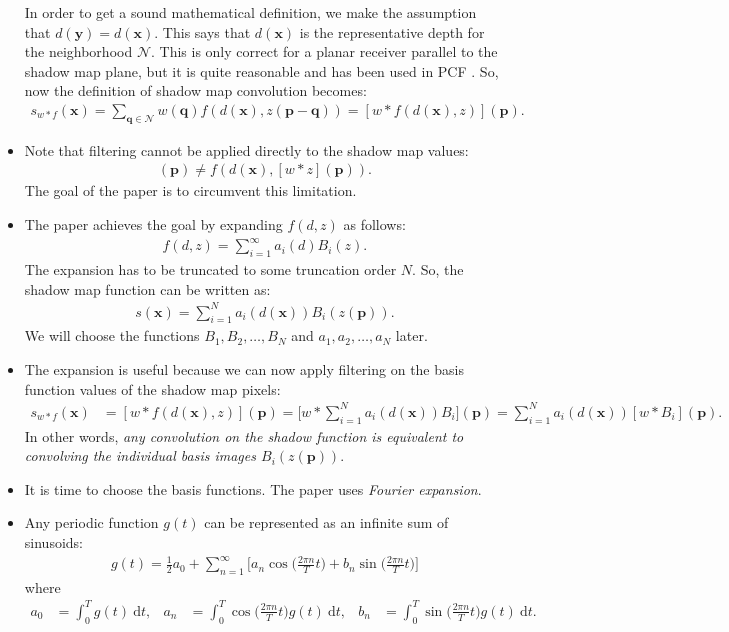 \documentclass[10pt]{article}
\newcommand{\dee}{\mathrm{d}}
\newcommand{\ve}[1]{\mathbf{#1}}
\begin{document}
\begin{itemize}
  	In order to get a sound mathematical definition, we make the assumption that $d(\ve{y}) = d(\ve{x})$.  This says that $d(\ve{x})$ is the representative depth for the neighborhood $\mathcal{N}$.  This is only correct for a planar receiver parallel to the shadow map plane, but it is quite reasonable and has been used in PCF \cite{Reeves:1987}.  So, now the definition of shadow map convolution becomes:
  	\begin{align*}
  		s_{w*f}(\ve{x}) 
  		= \sum_{\ve{q} \in \mathcal{N}} w(\ve{q}) f(d(\ve{x}), z(\ve{p} - \ve{q}))
  		= [w * f(d(\ve{x}),z)](\ve{p}).
  	\end{align*}

  	\item Note that filtering cannot be applied directly to the shadow map values:
  	\begin{align*}
  		[w * f(d(\ve{x}),z)](\ve{p}) \neq f(d(\ve{x}),[w*z](\ve{p})).
  	\end{align*}
  	The goal of the paper is to circumvent this limitation.

  	\item The paper achieves the goal by expanding $f(d,z)$ as follows:
  	\begin{align*}
  		f(d,z) = \sum_{i=1}^\infty a_i(d) B_i(z).
  	\end{align*}
  	The expansion has to be truncated to some truncation order $N$.  So, the shadow map function can be written as:
  	\begin{align*}
  		s(\ve{x}) = \sum_{i=1}^N a_i(d(\ve{x}))B_i(z(\ve{p})).
  	\end{align*}
  	We will choose the functions $B_1, B_2, \dotsc, B_N$ and $a_1, a_2, \dotsc, a_N$ later.

  	\item The expansion is useful because we can now apply filtering on the basis function values of the shadow map pixels:
  	\begin{align*}
  		s_{w * f}(\ve{x}) 
  		&= [w*f(d(\ve{x}),z)](\ve{p}) 
  		= \bigg[ w * \sum_{i=1}^N a_i(d(\ve{x})) B_i \bigg](\ve{p}) 
  		= \sum_{i=1}^N a_i(d(\ve{x})) [w*B_i](\ve{p}).  		
  	\end{align*}
  	In other words, \emph{any convolution on the shadow function is equivalent to convolving the individual basis images $B_i(z(\ve{p}))$}.

  	\item It is time to choose the basis functions.  The paper uses \emph{Fourier expansion}.

  	\item Any periodic function $g(t)$ can be represented as an infinite sum of sinusoids:
  	\begin{align*}
  		g(t) = \frac{1}{2} a_0 + \sum_{n=1}^\infty \bigg[ a_n \cos\bigg( \frac{2\pi n}{T} t \bigg) + b_n \sin\bigg(\frac{2\pi n}{T} t \bigg)  \bigg]
  	\end{align*}
  	where
  	\begin{align*}
  		a_0 &= \int_{0}^T g(t)\ \dee t, &
  		a_n &= \int_{0}^T \cos\bigg( \frac{2\pi n}{T} t \bigg) g(t)\ \dee t, &
  		b_n &= \int_{0}^T \sin\bigg( \frac{2\pi n}{T} t \bigg) g(t)\ \dee t.
  	\end{align*}


\end{itemize}
\end{document}

